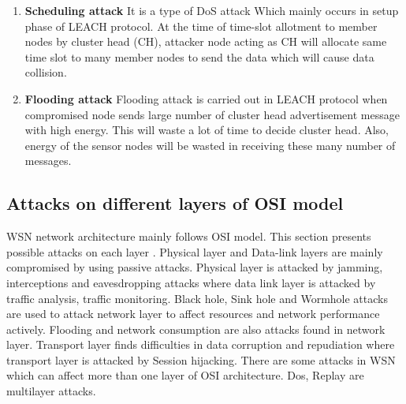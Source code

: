 \begin{enumerate}[label=\textbf{\roman*.}]
    \item \textbf{Scheduling attack }\cite{almomani2015performance} It is a type of DoS attack Which mainly occurs in setup phase of LEACH protocol. At the time of time-slot allotment to member nodes by cluster head (CH), attacker node acting as CH will allocate same time slot to many member nodes to send the data which will cause data collision.
    
    \item \textbf{Flooding attack }\cite{almomani2015performance} Flooding attack is carried out in LEACH protocol when compromised node sends large number of cluster head advertisement message with high energy. This will waste a lot of time to decide cluster head. Also, energy of the sensor nodes will be wasted in receiving these many number of messages.
\end{enumerate}

\subsection{Attacks on different layers of OSI model}
WSN network architecture mainly follows OSI model. This section presents possible attacks on each layer \cite{lupu2009main}. Physical layer and Data-link layers are mainly compromised by using passive attacks. Physical layer is attacked by jamming, interceptions and eavesdropping attacks where data link layer is attacked by traffic analysis, traffic monitoring. Black hole, Sink hole and Wormhole attacks are used to attack network layer to affect resources and network performance actively. Flooding and network consumption are also attacks found in network layer. Transport layer finds difficulties in data corruption and repudiation where transport layer is attacked by Session hijacking. There are some attacks in WSN which can affect more than one layer of OSI architecture. Dos, Replay are multilayer attacks.

